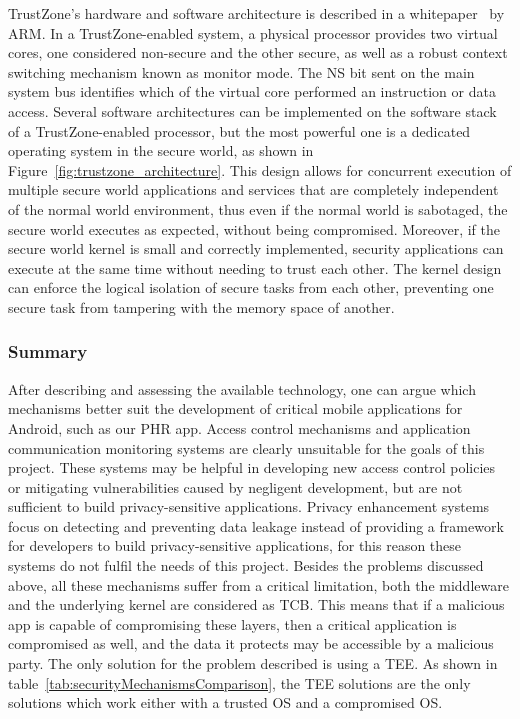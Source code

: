 TrustZone's hardware and software architecture is described in a whitepaper~\cite{trustzone_whitepaper} by ARM. In a TrustZone-enabled system, a physical processor provides two virtual cores, one considered non-secure and the other secure, as well as a robust context switching mechanism known as monitor mode. The NS bit sent on the main system bus identifies which of the virtual core performed an instruction or data access. Several software architectures can be implemented on the software stack of a TrustZone-enabled processor, but the most powerful one is a dedicated operating system in the secure world, as shown in Figure~\ref{fig:trustzone_architecture}. This design allows for concurrent execution of multiple secure world applications and services that are completely independent of the normal world environment, thus even if the normal world is sabotaged, the secure world executes as expected, without being compromised. Moreover, if the secure world kernel is small and correctly implemented, security applications can execute at the same time without needing to trust each other. The kernel design can enforce the logical isolation of secure tasks from each other, preventing one secure task from tampering with the memory space of another.

\subsubsection{Summary}

After describing and assessing the available technology, one can argue which mechanisms better suit the development of critical mobile applications for Android, such as our \ac{PHR} app. Access control mechanisms and application communication monitoring systems are clearly unsuitable for the goals of this project. These systems may be helpful in developing new access control policies or mitigating vulnerabilities caused by negligent development, but are not sufficient to build privacy-sensitive applications. Privacy enhancement systems focus on detecting and preventing data leakage instead of providing a framework for developers to build privacy-sensitive applications, for this reason these systems do not fulfil the needs of this project. Besides the problems discussed above, all these mechanisms suffer from a critical limitation, both the middleware and the underlying kernel are considered as \ac{TCB}. This means that if a malicious app is capable of compromising these layers, then a critical application is compromised as well, and the data it protects may be accessible by a malicious party. The only solution for the problem described is using a \ac{TEE}. As shown in table~\ref{tab:securityMechanismsComparison}, the \ac{TEE} solutions are the only solutions which work either with a trusted OS and a compromised OS.

